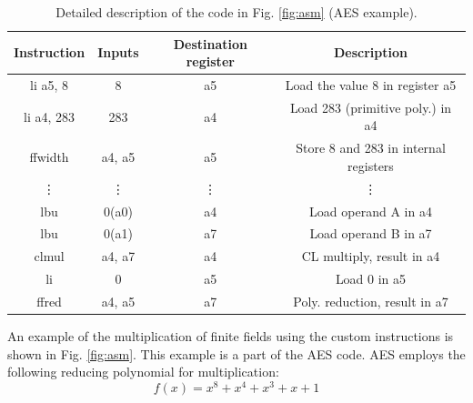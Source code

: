 \begin{table}[tp]
    \begin{tabular}{
    >{\columncolor[HTML]{EFEFEF}}c ccc}
    \cellcolor[HTML]{C0C0C0}Instruction          & \cellcolor[HTML]{C0C0C0}Inputs & \cellcolor[HTML]{C0C0C0}Destination register & \cellcolor[HTML]{C0C0C0}Description   \\ \hline
    li a5, 8                                     & 8                              & a5                                           & Load the value 8 in register a5       \\
    li a4, 283                                   & 283                            & a4                                           & Load 283 (primitive poly.) in a4      \\
    ffwidth                                      & a4, a5                         & a5                                           & Store 8 and 283 in internal registers \\
    \vdots & \vdots           & \vdots                         & \vdots                  \\
    lbu                                          & 0(a0)                          & a4                                           & Load operand A in a4                  \\
    lbu                                          & 0(a1)                          & a7                                           & Load operand B in a7                  \\
    clmul                                        & a4, a7                         & a4                                           & CL multiply, result in a4             \\
    li                                           & 0                              & a5                                           & Load 0 in a5                          \\
    ffred                                        & a4, a5                         & a7                                           & Poly. reduction, result in a7        
    \end{tabular}
    \caption{Detailed description of the code in Fig. \ref{fig:asm} (AES example).}
    \label{tab:detail}
\end{table}

An example of the multiplication of finite fields using the custom instructions is shown in Fig. \ref{fig:asm}. 
This example is a part of the AES code. AES employs the following reducing polynomial for multiplication:
\begin{equation}
    f(x) = x^{8} + x^{4} + x^{3} + x + 1
    \label{eq:aes}
\end{equation}

